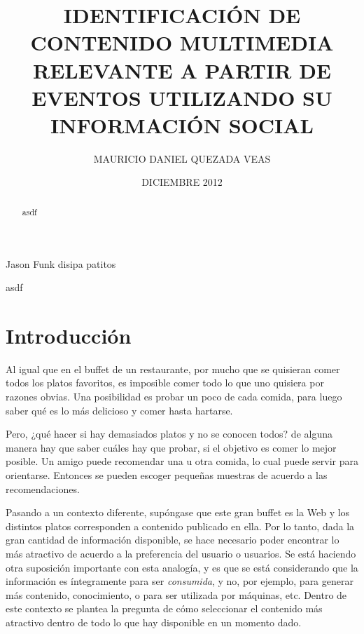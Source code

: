 \documentclass[upright, contnum]{umemoria}
\title{IDENTIFICACIÓN DE CONTENIDO MULTIMEDIA RELEVANTE A PARTIR DE EVENTOS UTILIZANDO SU INFORMACIÓN SOCIAL}
\author{MAURICIO DANIEL QUEZADA VEAS}
\date{DICIEMBRE 2012}
\begin{document}
\maketitle





\begin{abstract}
asdf
\end{abstract}

\begin{dedicatoria}
Jason Funk disipa patitos
\end{dedicatoria}

\begin{thanks}
asdf
\end{thanks}

\cleardoublepage
\tableofcontents

\mainmatter


\chapter{Introducción}
\label{sec-1}


Al igual que en el buffet de un restaurante, por mucho que se quisieran
comer todos los platos favoritos, es imposible comer todo lo que uno
quisiera por razones obvias. Una posibilidad es probar un poco de cada
comida, para luego saber qué es lo más delicioso y comer hasta
hartarse.

Pero, ¿qué hacer si hay demasiados platos y no se conocen todos? de
alguna manera hay que saber cuáles hay que probar, si el objetivo es
comer lo mejor posible. Un amigo puede recomendar una u otra comida,
lo cual puede servir para orientarse. Entonces se pueden escoger
pequeñas muestras de acuerdo a las recomendaciones.

Pasando a un contexto diferente, supóngase que este gran buffet es la
Web y los distintos platos corresponden a contenido publicado en
ella. Por lo tanto, dada la gran cantidad de información disponible,
se hace necesario poder encontrar lo más atractivo de acuerdo a la
preferencia del usuario o usuarios. Se está haciendo otra suposición
importante con esta analogía, y es que se está considerando que la
información es íntegramente para ser \emph{consumida}, y no, por ejemplo, para
generar más contenido, conocimiento, o para ser utilizada por
máquinas, etc. Dentro de
este contexto se plantea la pregunta de cómo seleccionar el contenido
más atractivo dentro de todo lo que hay disponible en un momento dado.
\end{document}
